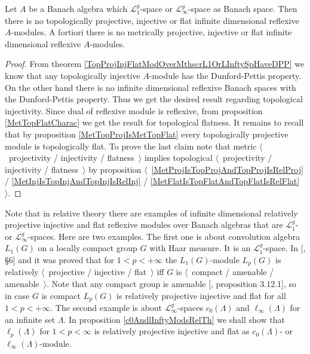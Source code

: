 \begin{corollary}\label{NoInfDimRefMetTopProjInjFlatModOverMthscrL1OrLInfty} Let $A$ be a Banach algebra which $\mathscr{L}_1^g$-space or $\mathscr{L}_\infty^g$-space as Banach space. Then there is no topologically projective, injective or flat infinite dimensional reflexive $A$-modules. A fortiori there is no metrically projective, injective or flat infinite dimensional reflexive $A$-modules.
\end{corollary}
\begin{proof} From theorem \ref{TopProjInjFlatModOverMthscrL1OrLInftySpHaveDPP} we know that any topologically injective $A$-module has the Dunford-Pettis property. On the other hand there is no infinite dimensional reflexive Banach spaces with the Dunford-Pettis property. Thus we get the desired result regarding topological injectivity. Since dual of reflexive module is reflexive, from proposition \ref{MetTopFlatCharac} we get the result for topological flatness. It remains to recall that by proposition \ref{MetTopProjIsMetTopFlat}  every topologically projective module is topologically flat. To prove the last claim note that metric $\langle$~projectivity / injectivity / flatness~$\rangle$ implies topological $\langle$~projectivity / injectivity / flatness~$\rangle$ by proposition $\langle$~\ref{MetProjIsTopProjAndTopProjIsRelProj} / \ref{MetInjIsTopInjAndTopInjIsRelInj} / \ref{MetFlatIsTopFlatAndTopFlatIsRelFlat}~$\rangle$.
\end{proof}

Note that in relative theory there are examples of infinite dimensional relatively projective injective and flat reflexive modules over Banach algebras that are $\mathscr{L}_1^g$- or $\mathscr{L}_\infty^g$-spaces. Here are two examples. The first one is about convolution algebra $L_1(G)$ on a locally compact group $G$ with Haar measure. It is an $\mathscr{L}_1^g$-space. In [\cite{DalPolHomolPropGrAlg}, \S6] and \cite{RachInjModAndAmenGr} it was proved that for $1<p<+\infty$ the $L_1(G)$-module $L_p(G)$ is relatively $\langle$~projective / injective / flat~$\rangle$ iff $G$ is $\langle$~compact / amenable / amenable~$\rangle$. Note that any compact group is amenable [\cite{PierAmenLCA}, proposition 3.12.1], so in case $G$ is compact $L_p(G)$ is relatively projective injective and flat for all $1<p<+\infty$.  The second example is about $\mathscr{L}_\infty^g$-spaces $c_0(\Lambda)$ and $\ell_\infty(\Lambda)$ for an infinite set $\Lambda$. In proposition \ref{c0AndlInftyModsRelTh} we shall show that $\ell_p(\Lambda)$ for $1<p<\infty$ is relatively projective injective and flat as $c_0(\Lambda)$- or $\ell_\infty(\Lambda)$-module. 

